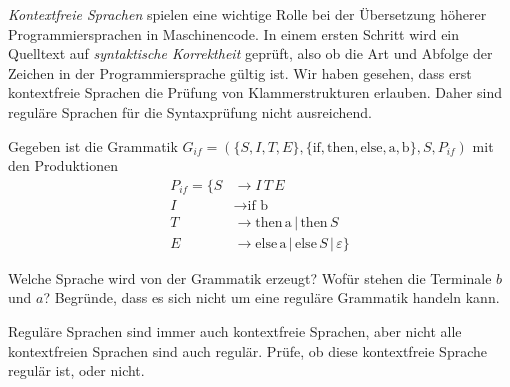 \documentclass[fontsize=10pt, a4paper, ngerman]{scrartcl}
\begin{document}
\ReiheTitel

\emph{Kontextfreie Sprachen} spielen eine wichtige Rolle bei der
Übersetzung höherer Programmiersprachen in Maschinencode. In einem
ersten Schritt wird ein Quelltext auf \emph{syntaktische Korrektheit}
geprüft, also ob die Art und Abfolge der Zeichen in der
Programmier\-sprache gültig ist. Wir haben gesehen, dass erst
kontextfreie Sprachen die Prüfung von Klammer\-strukturen erlauben.
Daher sind reguläre Sprachen für die Syntax\-prüfung nicht ausreichend.

\begin{aufgabe}
\label{aufg:grammatik-ifthenelse}
Gegeben ist die Grammatik $G_{if} = (\{S, I, T, E\}, \{\text{if},
\text{then}, \text{else}, \text{a}, \text{b}\}, S, P_{if})$ mit den
Produktionen
\begin{align*}
P_{if} = \{ S &\rightarrow I\, T\, E \\
            I &\rightarrow \text{if b} \\
            T &\rightarrow \text{then}\,\text{a} \,|\, \text{then}\, S \\
            E &\rightarrow \text{else}\,\text{a} \,|\, \text{else}\, S \,|\, \varepsilon \}
\end{align*}

\begin{enuma}
	\item Welche Sprache wird von der Grammatik erzeugt? Wofür stehen die Terminale $b$ und $a$? Begründe, dass es sich nicht um eine reguläre Grammatik handeln kann.
	\item Reguläre Sprachen sind immer auch kontextfreie Sprachen, aber nicht alle kontextfreien Sprachen sind auch regulär. Prüfe, ob diese kontextfreie Sprache regulär ist, oder nicht.

\end{enuma}
\end{aufgabe}
\end{document}
